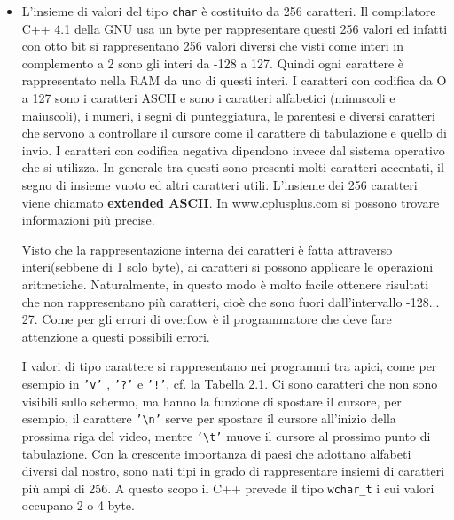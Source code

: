 \documentclass[a4paper,12pt]{book}
\begin{document}
\begin{itemize}
\item 
L'insieme di valori del tipo \texttt{char} è costituito da 256 caratteri.
Il compilatore C++ 4.1 della GNU usa un byte per rappresentare questi 256 valori ed infatti con otto bit si rappresentano 256 valori diversi che visti come interi in complemento a 2 sono gli interi da -128 a 127.
Quindi ogni carattere è rappresentato nella RAM da uno di questi interi.
I caratteri con codifica da O a 127 sono i caratteri ASCII e sono i caratteri alfabetici (minuscoli e maiuscoli), i numeri, i segni di punteggiatura, le parentesi e diversi caratteri che servono a controllare il cursore come il carattere di tabulazione e quello di invio.
I caratteri con codifica negativa dipendono invece dal sistema operativo che si utilizza.
In generale tra questi sono presenti molti caratteri accentati, il segno di insieme vuoto ed altri caratteri utili.
L'insieme dei 256 caratteri viene chiamato \textbf{extended ASCII}.
In www.cplusplus.com si possono trovare informazioni più precise. 

Visto che la rappresentazione interna dei caratteri è fatta attraverso interi(sebbene di 1 solo byte), ai caratteri si possono applicare le operazioni aritmetiche.
Naturalmente, in questo modo è molto facile ottenere risultati che non rappresentano più caratteri, cioè che sono fuori dall'intervallo -128... 27.
Come per gli errori di overflow è il programmatore che deve fare attenzione a questi possibili errori.

I valori di tipo carattere si rappresentano nei programmi tra apici, come per esempio in \texttt{'v'} , \texttt{'?'} e \texttt{'!'}, cf. la Tabella 2.1.
Ci sono caratteri che non sono visibili sullo schermo, ma hanno la funzione di spostare il cursore, per esempio, il carattere \texttt{'\textbackslash n'} serve per spostare il cursore all'inizio della prossima riga del video, mentre \texttt{'\textbackslash t'} muove il cursore al prossimo punto di tabulazione.
Con la crescente importanza di paesi che adottano alfabeti diversi dal nostro, sono nati tipi in grado di rappresentare insiemi di caratteri più ampi di 256.
A questo scopo il C++ prevede il tipo \texttt{wchar\_t} i cui valori occupano 2 o 4 byte. 


\end{itemize}
\end{document}
